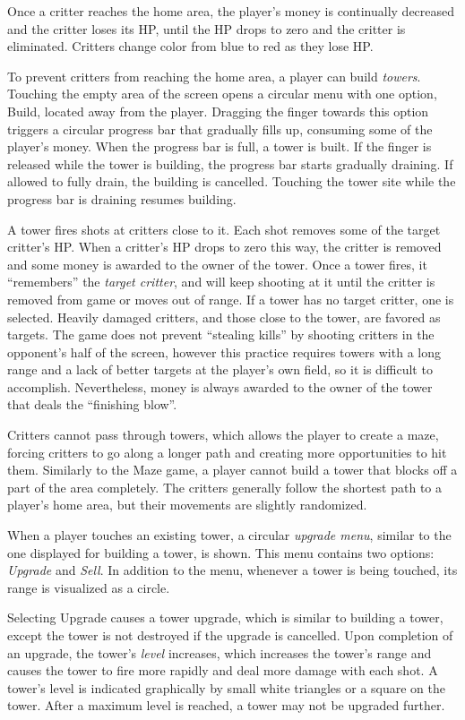 \documentclass[a4paper,11pt]{article}
\begin{document}
Once a critter reaches the home area, the player's money is continually
decreased and the critter loses its HP, until the HP drops to zero and the
critter is eliminated.
Critters change color from blue to red as they lose HP.

To prevent critters from reaching the home area, a player can build
\emph{towers}.
Touching the empty area of the screen opens a circular menu with one option,
Build, located away from the player.
Dragging the finger towards this option triggers a circular progress bar that
gradually fills up, consuming some of the player's money.
When the progress bar is full, a tower is built.
If the finger is released while the tower is building, the progress bar
starts gradually draining.
If allowed to fully drain, the building is cancelled.
Touching the tower site while the progress bar is draining resumes building.

A tower fires shots at critters close to it.
Each shot removes some of the target critter's HP.
When a critter's HP drops to zero this way, the critter is removed and some
money is awarded to the owner of the tower.
Once a tower fires, it “remembers” the \emph{target critter}, and will keep
shooting at it until the critter is removed from game or moves out of range.
If a tower has no target critter, one is selected.
Heavily damaged critters, and those close to the tower, are favored as targets.
The game does not prevent “stealing kills” by shooting critters in the
opponent's half of the screen, however this practice requires towers with a
long range and a lack of better targets at the player's own field, so it is
difficult to accomplish.
Nevertheless, money is always awarded to the owner of the tower that deals the
“finishing blow”.

Critters cannot pass through towers, which allows the player to create a maze,
forcing critters to go along a longer path and creating more
opportunities to hit them.
Similarly to the Maze game, a player cannot build a tower that blocks off a
part of the area completely.
The critters generally follow the shortest path to a player's home area,
but their movements are slightly randomized.

When a player touches an existing tower, a circular \emph{upgrade menu},
similar to the one displayed for building a tower, is shown.
This menu contains two options: \emph{Upgrade} and \emph{Sell}.
In addition to the menu, whenever a tower is being touched, its range
is visualized as a circle.

Selecting Upgrade causes a tower upgrade, which is similar to building a tower,
except the tower is not destroyed if the upgrade is cancelled.
Upon completion of an upgrade, the tower's \emph{level} increases, which
increases the tower's range and causes the tower to fire more rapidly and deal
more damage with each shot.
A tower's level is indicated graphically by small white triangles or a square
on the tower.
After a maximum level is reached, a tower may not be upgraded further.
\end{document}
